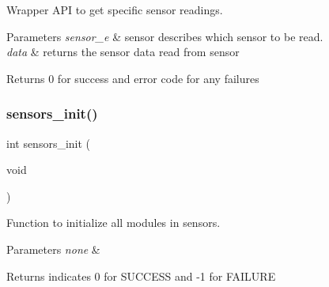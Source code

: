 Wrapper A\+PI to get specific sensor readings. 


\begin{DoxyParams}{Parameters}
{\em sensor\+\_\+e} & sensor describes which sensor to be read.\\
\hline
{\em data} & returns the sensor data read from sensor\\
\hline
\end{DoxyParams}
\begin{DoxyReturn}{Returns}
0 for success and error code for any failures 
\end{DoxyReturn}
\mbox{\label{group___base_sensors_module_ga5671eda6cef44f562fc5546701bad52b}} 
\subsubsection{\texorpdfstring{sensors\+\_\+init()}{sensors\_init()}}
{\footnotesize\ttfamily int sensors\+\_\+init (\begin{DoxyParamCaption}\item[{void}]{ }\end{DoxyParamCaption})}



Function to initialize all modules in sensors. 


\begin{DoxyParams}{Parameters}
{\em none} & \\
\hline
\end{DoxyParams}
\begin{DoxyReturn}{Returns}
indicates 0 for S\+U\+C\+C\+E\+SS and -\/1 for F\+A\+I\+L\+U\+RE 
\end{DoxyReturn}
